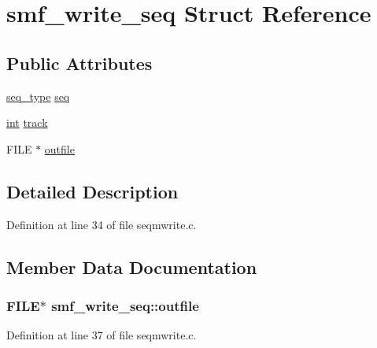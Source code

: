 \hypertarget{structsmf__write__seq}{}\section{smf\+\_\+write\+\_\+seq Struct Reference}
\label{structsmf__write__seq}
\subsection*{Public Attributes}
\begin{DoxyCompactItemize}
\item 
\hyperlink{seq_8h_a6ee3fb417f66f6b4cfcc515eef1f5d4a}{seq\+\_\+type} \hyperlink{structsmf__write__seq_a72ac3f8583c15f31fc4861c0ac45e14f}{seq}
\item 
\hyperlink{xmltok_8h_a5a0d4a5641ce434f1d23533f2b2e6653}{int} \hyperlink{structsmf__write__seq_aedc9df4cdb646d9de42aff9ea477e335}{track}
\item 
F\+I\+LE $\ast$ \hyperlink{structsmf__write__seq_a18b0698d035409dc42cd92d33c2dd936}{outfile}
\end{DoxyCompactItemize}


\subsection{Detailed Description}


Definition at line 34 of file seqmwrite.\+c.



\subsection{Member Data Documentation}
\subsubsection[{\texorpdfstring{outfile}{outfile}}]{\setlength{\rightskip}{0pt plus 5cm}F\+I\+LE$\ast$ smf\+\_\+write\+\_\+seq\+::outfile}\hypertarget{structsmf__write__seq_a18b0698d035409dc42cd92d33c2dd936}{}\label{structsmf__write__seq_a18b0698d035409dc42cd92d33c2dd936}


Definition at line 37 of file seqmwrite.\+c.


